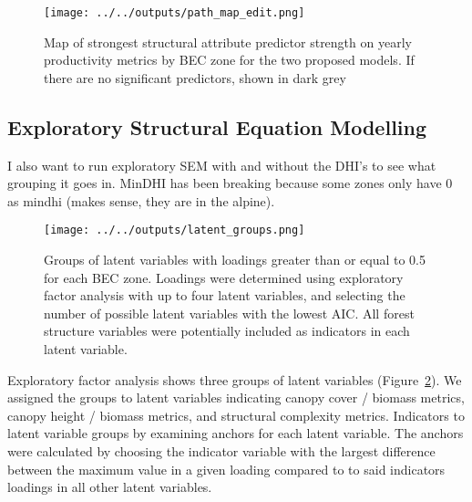 \documentclass[
  authoryear,
  review,
  3p,
  twocolumn]{elsarticle}
\begin{document}
\begin{figure}

{\centering \texttt{[image: ../../outputs/path\_map\_edit.png]}

}

\caption{\label{fig-pathmap}Map of strongest structural attribute
predictor strength on yearly productivity metrics by BEC zone for the
two proposed models. If there are no significant predictors, shown in
dark grey}

\end{figure}

\hypertarget{exploratory-structural-equation-modelling-1}{%
\subsection{Exploratory Structural Equation
Modelling}\label{exploratory-structural-equation-modelling-1}}

I also want to run exploratory SEM with and without the DHI's to see
what grouping it goes in. MinDHI has been breaking because some zones
only have 0 as mindhi (makes sense, they are in the alpine).

\begin{figure}

{\centering \texttt{[image: ../../outputs/latent\_groups.png]}

}

\caption{\label{fig-esem-latent}Groups of latent variables with loadings
greater than or equal to 0.5 for each BEC zone. Loadings were determined
using exploratory factor analysis with up to four latent variables, and
selecting the number of possible latent variables with the lowest AIC.
All forest structure variables were potentially included as indicators
in each latent variable.}

\end{figure}

Exploratory factor analysis shows three groups of latent variables
(Figure~\ref{fig-esem-latent}). We assigned the groups to latent
variables indicating canopy cover / biomass metrics, canopy height /
biomass metrics, and structural complexity metrics. Indicators to latent
variable groups by examining anchors for each latent variable. The
anchors were calculated by choosing the indicator variable with the
largest difference between the maximum value in a given loading compared
to to said indicators loadings in all other latent variables.
\end{document}
